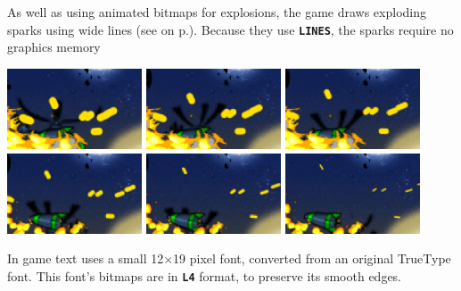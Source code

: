 \documentclass[10pt]{book}
\newcommand{\mach}[1]{\texttt{\textbf{#1}}}
\newcommand{\xref}[1]{\textit{\nameref{#1}} on  p.\pageref{#1}}
\begin{document}
As well as using animated bitmaps for explosions,
the game draws exploding sparks using wide lines (see \xref{lines}).
Because they use \mach{LINES}, the sparks require no graphics memory
\begin{center}
\includegraphics[width=0.3\textwidth]{assets/ns-lines-0006.png}
\includegraphics[width=0.3\textwidth]{assets/ns-lines-0007.png}
\includegraphics[width=0.3\textwidth]{assets/ns-lines-0008.png}
\includegraphics[width=0.3\textwidth]{assets/ns-lines-0009.png}
\includegraphics[width=0.3\textwidth]{assets/ns-lines-0010.png}
\includegraphics[width=0.3\textwidth]{assets/ns-lines-0011.png}
\end{center}

\noindent
In game text uses a small 12$\times$19 pixel font, converted from an
original TrueType font.
This font's bitmaps are in \mach{L4} format, to preserve its smooth edges.
\end{document}

